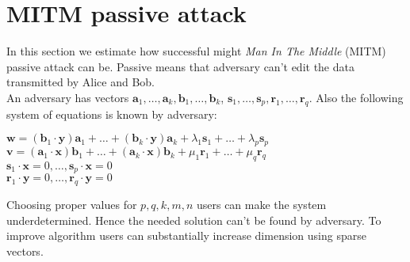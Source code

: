 \section{MITM passive attack}
In this section we estimate how successful might \textit{Man In The Middle} (MITM) passive attack can be. Passive means that adversary can't edit the data transmitted by Alice and Bob. \\
An adversary has vectors $ \textbf{a}_1, \dots, \textbf{a}_k, \textbf{b}_1, \dots, \textbf{b}_k $, $ \textbf{s}_1, \dots, \textbf{s}_p, \textbf{r}_1, \dots, \textbf{r}_q $. Also the following system of equations is known by adversary:
\begin{center}
	$\textbf{w} = (\textbf{b}_1 \cdot \textbf{y}) \textbf{a}_1 + \dots + (\textbf{b}_k \cdot \textbf{y}) \textbf{a}_k + \lambda_1 \textbf{s}_1 + \dots + \lambda_p \textbf{s}_p$ \\
	$ \textbf{v} = (\textbf{a}_1 \cdot \textbf{x}) \textbf{b}_1 + \dots + (\textbf{a}_k \cdot \textbf{x}) \textbf{b}_k + \mu_1 \textbf{r}_1 + \dots + \mu_q \textbf{r}_q $ \\
	$\textbf{s}_1 \cdot \textbf{x} = 0, \dots, \textbf{s}_p \cdot \textbf{x} = 0$ \\
	$\textbf{r}_1 \cdot \textbf{y} = 0, \dots, \textbf{r}_q \cdot \textbf{y} = 0 $
\end{center}
Choosing proper values for $ p, q, k, m, n $ users can make the system underdetermined. Hence the needed solution can't be found by adversary. To improve algorithm users can substantially increase dimension using sparse vectors. 
